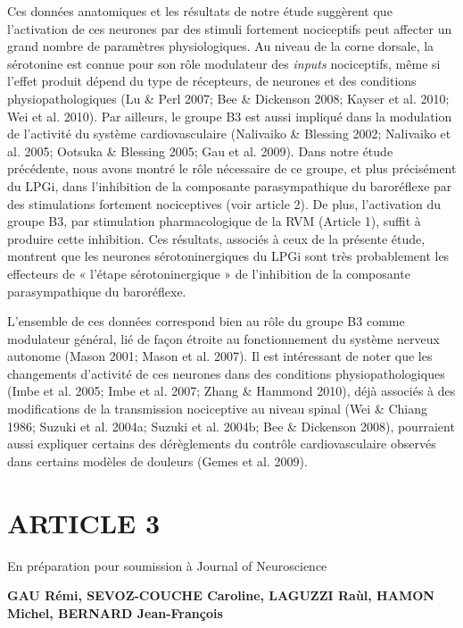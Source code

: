 \documentclass[a4paper,12pt,twoside]{report}
\begin{document}
Ces données anatomiques et les résultats de notre étude suggèrent que l’activation de ces neurones par des stimuli fortement nociceptifs peut affecter un grand nombre de paramètres physiologiques. Au niveau de la corne dorsale, la sérotonine est connue pour son rôle modulateur des \textit{inputs} nociceptifs, même si l’effet produit dépend du type de récepteurs, de neurones et des conditions physiopathologiques (Lu \& Perl 2007; Bee \& Dickenson 2008; Kayser et al. 2010; Wei et al. 2010). Par ailleurs, le groupe B3 est aussi impliqué dans la modulation de l’activité du système cardiovasculaire (Nalivaiko \& Blessing 2002; Nalivaiko et al. 2005; Ootsuka \& Blessing 2005; Gau et al. 2009). Dans notre étude précédente, nous avons montré le rôle nécessaire de ce groupe, et plus précisément du LPGi, dans l’inhibition de la composante parasympathique du baroréflexe par des stimulations fortement nociceptives (voir article 2). De plus, l’activation du groupe B3, par stimulation pharmacologique de la RVM (Article 1), suffit à produire cette inhibition. Ces résultats, associés à ceux de la présente étude, montrent que les neurones sérotoninergiques du LPGi sont très probablement les effecteurs de « l’étape sérotoninergique » de l’inhibition de la composante parasympathique du baroréflexe.

L’ensemble de ces données correspond bien au rôle du groupe B3 comme modulateur général, lié de façon étroite au fonctionnement du système nerveux autonome (Mason 2001; Mason et al. 2007). Il est intéressant de noter que les changements d’activité de ces neurones dans des conditions physiopathologiques (Imbe et al. 2005; Imbe et al. 2007; Zhang \& Hammond 2010), déjà associés à des modifications de la transmission nociceptive au niveau spinal (Wei \& Chiang 1986; Suzuki et al. 2004a; Suzuki et al. 2004b; Bee \& Dickenson 2008), pourraient aussi expliquer certains des dérèglements du contrôle cardiovasculaire observés dans certains modèles de douleurs (Gemes et al. 2009).

\cleardoublepage

\section{ARTICLE 3}

\vfill

En préparation pour soumission à Journal of Neuroscience

\bigskip 

\begin{large}\textbf{GAU Rémi, SEVOZ-COUCHE Caroline, LAGUZZI Raùl, HAMON Michel, BERNARD Jean-François}\end{large}
\end{document}
